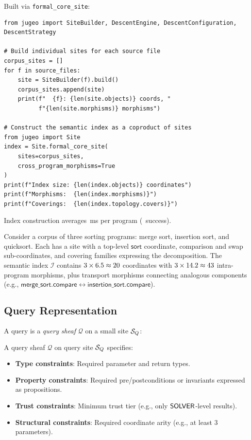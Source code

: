 \documentclass[11pt]{article}
\newcommand{\FormalCoreSite}{\texttt{formal\_core\_site}}
\newcommand{\SemIndex}{\mathcal{I}}
\newcommand{\QuerySheaf}{\mathcal{Q}}
\begin{document}
Built via \FormalCoreSite:

\begin{lstlisting}[style=jugeo-python]
from jugeo import SiteBuilder, DescentEngine, DescentConfiguration, DescentStrategy

# Build individual sites for each source file
corpus_sites = []
for f in source_files:
    site = SiteBuilder(f).build()
    corpus_sites.append(site)
    print(f"  {f}: {len(site.objects)} coords, "
          f"{len(site.morphisms)} morphisms")

# Construct the semantic index as a coproduct of sites
from jugeo import Site
index = Site.formal_core_site(
    sites=corpus_sites,
    cross_program_morphisms=True
)
print(f"Index size: {len(index.objects)} coordinates")
print(f"Morphisms:  {len(index.morphisms)}")
print(f"Coverings:  {len(index.topology.covers)}")
\end{lstlisting}

Index construction averages \compProfFormalCoreSiteMeanMs\,ms per program (\compProfFormalCoreSiteRate\ success).

\begin{example}\label{ex:sorting-index}
Consider a corpus of three sorting programs: merge sort, insertion sort,
and quicksort.  Each has a site with a top-level $\mathsf{sort}$
coordinate, comparison and swap sub-coordinates, and covering families
expressing the decomposition.  The semantic index $\SemIndex$
contains $3 \times 6.5 \approx 20$ coordinates with
$3 \times 14.2 \approx 43$ intra-program morphisms,
plus transport morphisms connecting analogous components (e.g.,
$\mathsf{merge\_sort.compare} \leftrightarrow
\mathsf{insertion\_sort.compare}$).
\end{example}

\subsection{Query Representation}
A query is a \emph{query sheaf} $\QuerySheaf$ on a small site $\mathcal{S}_Q$:

\begin{definition}\label{def:query-sheaf}
A query sheaf $\QuerySheaf$ on query site $\mathcal{S}_Q$ specifies:
\begin{itemize}[noitemsep]
  \item \textbf{Type constraints}: Required parameter and return types.
  \item \textbf{Property constraints}: Required pre/postconditions or
        invariants expressed as propositions.
  \item \textbf{Trust constraints}: Minimum trust tier (e.g., only
        $\mathsf{SOLVER}$-level results).
  \item \textbf{Structural constraints}: Required coordinate arity
        (e.g., at least 3 parameters).
\end{itemize}
\end{definition}
\end{document}
